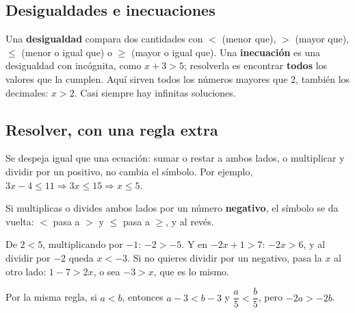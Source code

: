 \subsection{Desigualdades e inecuaciones}
Una \textbf{desigualdad} compara dos cantidades con $<$ (menor que), $>$ (mayor que), $\leq$ (menor o igual que) o $\geq$ (mayor o igual que). Una \textbf{inecuación} es una desigualdad con incógnita, como $x + 3 > 5$; resolverla es encontrar \textbf{todos} los valores que la cumplen. Aquí sirven todos los números mayores que 2, también los decimales: $x > 2$. Casi siempre hay infinitas soluciones.

\subsection{Resolver, con una regla extra}
Se despeja igual que una ecuación: sumar o restar a ambos lados, o multiplicar y dividir por un positivo, no cambia el símbolo. Por ejemplo, $3x - 4 \leq 11 \Rightarrow 3x \leq 15 \Rightarrow x \leq 5$.
\begin{clave} Si multiplicas o divides ambos lados por un número \textbf{negativo}, el símbolo se da vuelta: $<$ pasa a $>$ y $\leq$ pasa a $\geq$, y al revés.\end{clave}
\begin{ejemplo} De $2 < 5$, multiplicando por $-1$: $-2 > -5$. Y en $-2x + 1 > 7$: $-2x > 6$, y al dividir por $-2$ queda $x < -3$. Si no quieres dividir por un negativo, pasa la $x$ al otro lado: $1 - 7 > 2x$, o sea $-3 > x$, que es lo mismo.\end{ejemplo}
Por la misma regla, si $a < b$, entonces $a - 3 < b - 3$ y $\dfrac{a}{5} < \dfrac{b}{5}$, pero $-2a > -2b$.

